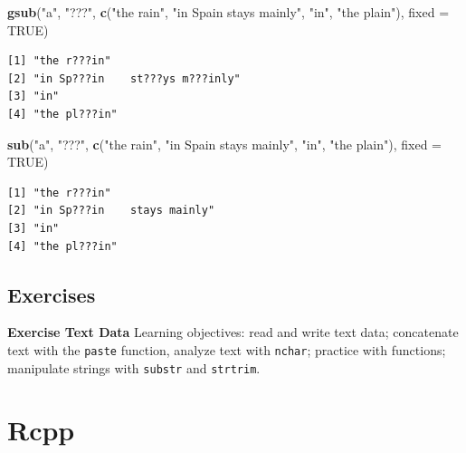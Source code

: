 \documentclass[
]{krantz}
\makeatletter
\newenvironment{Shaded}{\begin{snugshade}}{\end{snugshade}}
\newcommand{\DataTypeTok}[1]{\textcolor[rgb]{0.27,0.27,0.27}{#1}}
\newcommand{\KeywordTok}[1]{\textcolor[rgb]{0.27,0.27,0.27}{\textbf{#1}}}
\newcommand{\NormalTok}[1]{#1}
\newcommand{\OtherTok}[1]{\textcolor[rgb]{0.37,0.37,0.37}{#1}}
\newcommand{\StringTok}[1]{\textcolor[rgb]{0.5,0.5,0.5}{#1}}
\newenvironment{kframe}{%
\medskip{}
\setlength{\fboxsep}{.8em}
 \def\at@end@of@kframe{}%
 \ifinner\ifhmode%
  \def\at@end@of@kframe{\end{minipage}}%
  \begin{minipage}{\columnwidth}%
 \fi\fi%
 \def\FrameCommand##1{\hskip\@totalleftmargin \hskip-\fboxsep
 \colorbox{shadecolor}{##1}\hskip-\fboxsep
     \hskip-\linewidth \hskip-\@totalleftmargin \hskip\columnwidth}%
 \MakeFramed {\advance\hsize-\width
   \@totalleftmargin\z@ \linewidth\hsize
   \@setminipage}}%
 {\par\unskip\endMakeFramed%
 \at@end@of@kframe}
\renewenvironment{Shaded}{\begin{kframe}}{\end{kframe}}
\makeatother
\begin{document}
\begin{Shaded}
\begin{Highlighting}[]
\KeywordTok{gsub}\NormalTok{(}\StringTok{"a"}\NormalTok{, }\StringTok{"???"}\NormalTok{, }\KeywordTok{c}\NormalTok{(}\StringTok{"the rain"}\NormalTok{, }\StringTok{"in Spain    stays mainly"}\NormalTok{, }\StringTok{"in"}\NormalTok{, }
                   \StringTok{"the plain"}\NormalTok{), }\DataTypeTok{fixed =} \OtherTok{TRUE}\NormalTok{)}
\end{Highlighting}
\end{Shaded}

\begin{verbatim}
[1] "the r???in"                    
[2] "in Sp???in    st???ys m???inly"
[3] "in"                            
[4] "the pl???in"                   
\end{verbatim}

\begin{Shaded}
\begin{Highlighting}[]
\KeywordTok{sub}\NormalTok{(}\StringTok{"a"}\NormalTok{, }\StringTok{"???"}\NormalTok{, }\KeywordTok{c}\NormalTok{(}\StringTok{"the rain"}\NormalTok{, }\StringTok{"in Spain    stays mainly"}\NormalTok{, }\StringTok{"in"}\NormalTok{, }
                  \StringTok{"the plain"}\NormalTok{), }\DataTypeTok{fixed =} \OtherTok{TRUE}\NormalTok{)}
\end{Highlighting}
\end{Shaded}

\begin{verbatim}
[1] "the r???in"                
[2] "in Sp???in    stays mainly"
[3] "in"                        
[4] "the pl???in"               
\end{verbatim}

\hypertarget{textEx}{%
\section{Exercises}\label{textEx}}

\textbf{Exercise Text Data} Learning objectives: read and write text data; concatenate text with the \texttt{paste} function, analyze text with \texttt{nchar}; practice with functions; manipulate strings with \texttt{substr} and \texttt{strtrim}.

\hypertarget{rcpp}{%
\chapter{Rcpp}\label{rcpp}}
\end{document}
